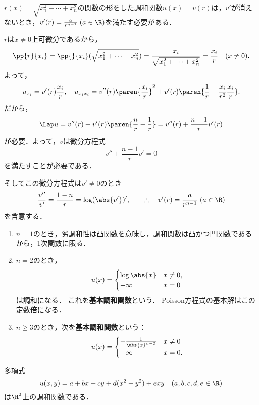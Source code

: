 \documentclass[uplatex,dvipdfmx]{jsreport}
\begin{document}
\begin{proposition}[球対称な調和関数の必要条件]\label{prop-necessary-condition-for-sphere-symmetric-harmonic-functions}
    $r(x)=\sqrt{x^2_1+\cdots+x_n^2}$の関数の形をした調和関数$u(x)=v(r)$は，$v'$が消えないとき，$v'(r)=\frac{a}{r^{n-1}}\;(a\in\R)$を満たす必要がある．
\end{proposition}
\begin{Proof}
    $r$は$x\ne0$上可微分であるから，
    \[\pp{r}{x_i}=\pp{}{x_i}(\sqrt{x_1^2+\cdots+x_n^2})=\frac{x_i}{\sqrt{x_1^2+\cdots+x_n^2}}=\frac{x_i}{r}\quad(x\ne0).\]
    よって，
    \[u_{x_i}=v'(r)\frac{x_i}{r},\quad u_{x_ix_i}=v''(r)\paren{\frac{x_i}{r}}^2+v'(r)\paren{\frac{1}{r}-\frac{x_i}{r^2}\frac{x_i}{r}}.\]
    だから，
    \[\Lap u=v''(r)+v'(r)\paren{\frac{n}{r}-\frac{1}{r}}=v''(r)+\frac{n-1}{r}v'(r)\]
    が必要．よって，$v$は微分方程式
    \[v''+\frac{n-1}{r}v'=0\]
    を満たすことが必要である．

    そしてこの微分方程式は$v'\ne0$のとき
    \[\frac{v''}{v'}=\frac{1-n}{r}=\log(\abs{v'})',\qquad\therefore\quad v'(r)=\frac{a}{r^{n-1}}\;(a\in\R)\]
    を含意する．
\end{Proof}

\begin{example}[基本調和関数]\mbox{}
    \begin{enumerate}
        \item $n=1$のとき，劣調和性は凸関数を意味し，調和関数は凸かつ凹関数であるから，1次関数に限る．
        \item $n=2$のとき，
        \[u(x)=\begin{cases}
            \log\abs{x}&x\ne0,\\
            -\infty&x=0
        \end{cases}\]
        は調和になる．
        これを\textbf{基本調和関数}という．
        Poisson方程式の基本解はこの定数倍になる．
        \item $n\ge3$のとき，次を\textbf{基本調和関数}という：
        \[u(x)=\begin{cases}
            -\frac{1}{\abs{x}^{n-2}}&x\ne 0\\
            -\infty&x=0.
        \end{cases}\]
    \end{enumerate}
\end{example}

\begin{example}
    多項式
    \[u(x,y)=a+bx+cy+d(x^2-y^2)+exy\quad(a,b,c,d,e\in\R)\]
    は$\R^2$上の調和関数である．
\end{example}
\end{document}
